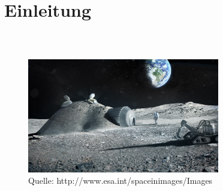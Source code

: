 \section{Einleitung}
\begin{frame}
	\frametitle{\,}
	
	\begin{figure}
	   	\centering
	   	\includegraphics[height = 5cm]{../images/presentation/LunarBaseESA.jpg}
	   	\caption{Quelle: http://www.esa.int/spaceinimages/Images}
	\end{figure}
	

\end{frame} 


